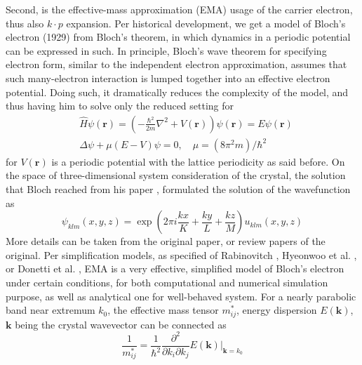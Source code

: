 \documentclass[%
 reprint,
 amsmath,amssymb,
 aps,
]{revtex4-2}
\begin{document}
Second, is the effective-mass approximation (EMA) usage of the carrier electron, thus also $k\cdot p$ expansion. Per historical development, we get a model of Bloch's electron (1929) from Bloch's theorem, in which dynamics in a periodic potential can be expressed in such. In principle, Bloch's wave theorem for specifying electron form, similar to the independent electron approximation, assumes that such many-electron interaction is lumped together into an effective electron potential. Doing such, it dramatically reduces the complexity of the model, and thus having him to solve only the reduced setting for
\begin{equation}
    \begin{split}
        &\hat{H}\psi(\mathbf{r}) = \left(-\frac{\hbar^2}{2m}\nabla^{2} + V(\mathbf{r})\right)\psi(\mathbf{r}) = E\psi(\mathbf{r})\\
        & \Delta \psi + \mu (E-V)\psi = 0, \quad \mu = (8\pi^{2}m)/\hbar^{2}
    \end{split}
\end{equation}
for $V(\mathbf{r})$ is a periodic potential with the lattice periodicity as said before. On the space of three-dimensional system consideration of the crystal, the solution that Bloch reached from his paper \cite{blochUberQuantenmechanikElektronen1929a}, formulated the solution of the wavefunction as
\begin{equation}
    \psi_{klm}(x,y,z) = \exp{\left( 2\pi i \dfrac{kx}{K}+\dfrac{ky}{L}+\dfrac{kz}{M} \right)}u_{klm}(x,y,z)
\end{equation}
More details can be taken from the original paper, or review papers of the original. Per simplification models, as specified of Rabinovitch \cite{PhysRevB.4.1017}, Hyeonwoo et al. \cite{Yeo_2020}, or Donetti et al. \cite{10.1063/1.3639281}, EMA is a very effective, simplified model of Bloch's electron under certain conditions, for both computational and numerical simulation purpose, as well as analytical one for well-behaved system. For a nearly parabolic band near extremum $k_{0}$, the effective mass tensor $m_{ij}^{*}$, energy dispersion $E(\mathbf{k})$, $\mathbf{k}$ being the crystal wavevector can be connected as
\begin{equation}
    \frac{1}{m_{ij}^{*}} = \frac{1}{\hbar^2} \frac{\partial^{2}}{\partial k_{i}\partial k_{j}}E(\mathbf{k}) \Bigg\rvert_{\mathbf{k}=k_{0}}
\end{equation}
\end{document}
